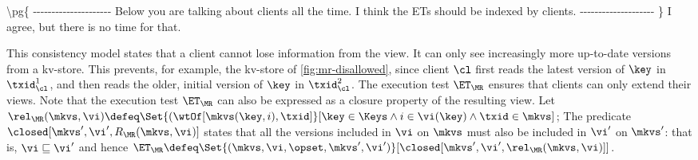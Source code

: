 
\ac{
\pg{
---------------------

Below you are talking about clients all the time. I think the ETs
should be indexed by clients.

--------------------
}
I agree, but there is no time for that.
}

This consistency model states that a client
cannot lose information from the view. It  
can only see increasingly more up-to-date versions from a kv-store. 
This prevents, for example, the kv-store of \cref{fig:mr-disallowed},
since client $\cl$ first reads the latest version of $\key$ in $\txid_{\cl}^{1}$, 
and then reads the older, initial version of $\key$ in $\txid_{\cl}^{2}$.  
The execution test $\ET_{\MR}$ ensures that clients  can only extend their views. 
Note that the execution test $\ET_{\MR}$ can also be expressed as a closure 
property of the resulting view. 
Let $\rel_{\MR}(\mkvs, \vi) \defeq \Set{(\wtOf[\mkvs(\key, i), \txid] }[ \key \in \Keys \wedge i \in \vi(\key) \wedge \txid \in \mkvs]$; 
The predicate $\closed[\mkvs', \vi', R_{\MR}(\mkvs, \vi)]$ states that all the versions included in $\vi$ on $\mkvs$ 
must also be included in $\vi'$ on $\mkvs'$: that is,  $\vi
\sqsubseteq \vi'$ and  hence 
$\ET_{\MR} \defeq \Set{(\mkvs, \vi, \opset, \mkvs', \vi') }[
\closed[\mkvs', \vi', \rel_{\MR}(\mkvs, \vi)]]$.


